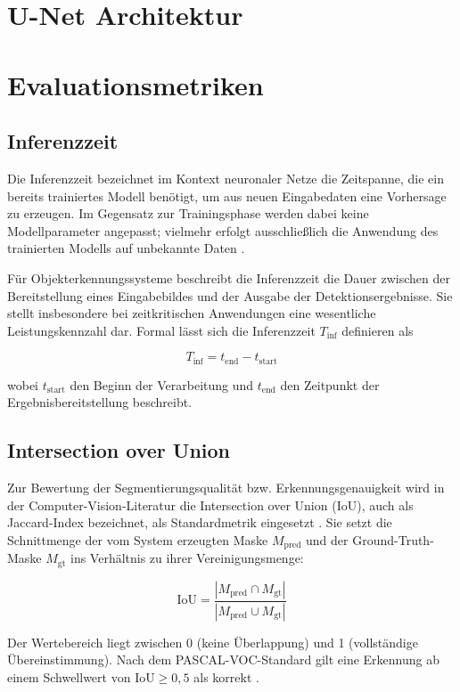 \section{U-Net Architektur}

\section{Evaluationsmetriken}

\subsection{Inferenzzeit}

Die Inferenzzeit bezeichnet im Kontext neuronaler Netze die Zeitspanne, die ein bereits trainiertes Modell benötigt, um aus neuen Eingabedaten eine Vorhersage zu erzeugen. Im Gegensatz zur Trainingsphase werden dabei keine Modellparameter angepasst; vielmehr erfolgt ausschließlich die Anwendung des trainierten Modells auf unbekannte Daten \cite{Goodfellow-et-al-2016}.

Für Objekterkennungssysteme beschreibt die Inferenzzeit die Dauer zwischen der Bereitstellung eines Eingabebildes und der Ausgabe der Detektionsergebnisse. Sie stellt insbesondere bei zeitkritischen Anwendungen eine wesentliche Leistungskennzahl dar. Formal lässt sich die Inferenzzeit $T_{\text{inf}}$ definieren als

\begin{equation}
T_{\text{inf}} = t_{\text{end}} - t_{\text{start}}
\end{equation}

wobei $t_{\text{start}}$ den Beginn der Verarbeitung und $t_{\text{end}}$ den Zeitpunkt der Ergebnisbereitstellung beschreibt.

\subsection{Intersection over Union}

Zur Bewertung der Segmentierungsqualität bzw. Erkennungsgenauigkeit wird in der Computer-Vision-Literatur die Intersection over Union (IoU), auch als Jaccard-Index bezeichnet, als Standardmetrik eingesetzt \cite{everingham2010pascal}. Sie setzt die Schnittmenge der vom System erzeugten Maske $M_{\text{pred}}$ und der Ground-Truth-Maske $M_{\text{gt}}$ ins Verhältnis zu ihrer Vereinigungsmenge:

\[
\text{IoU} = \frac{|M_{\text{pred}} \cap M_{\text{gt}}|}
                  {|M_{\text{pred}} \cup M_{\text{gt}}|}
\]

Der Wertebereich liegt zwischen 0 (keine Überlappung) und 1 (vollständige Übereinstimmung). Nach dem PASCAL-VOC-Standard gilt eine Erkennung ab einem Schwellwert von $\text{IoU} \geq 0{,}5$ als korrekt \cite{everingham2010pascal}.